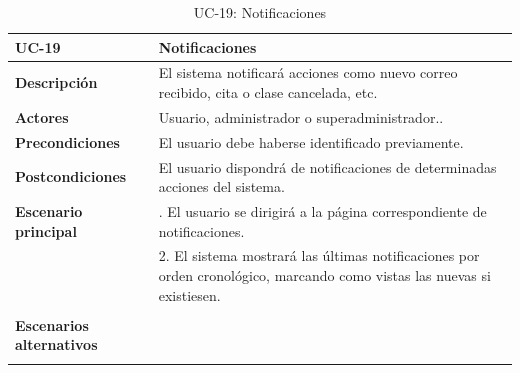 \begin{table}
  \begin{center}
    \begin{tabularx}{16.4cm}{|l|X|}
      \hline
      \textbf{UC-19} & \textbf{Notificaciones}\\
      \hline
      \textbf{Descripción} & El sistema notificará acciones como nuevo correo recibido, cita o clase cancelada, etc. \\
      \hline
      \textbf{Actores} & Usuario, administrador o superadministrador..\\
      \hline
      \textbf{Precondiciones} & El usuario debe haberse identificado previamente.\\
      \hline
      \textbf{Postcondiciones} & El usuario dispondrá de notificaciones de determinadas acciones del sistema. \\
      \hline
      \textbf{Escenario principal} & \smallskip 1. El usuario se dirigirá a la página correspondiente de notificaciones.\\
      & 2. El sistema mostrará las últimas notificaciones por orden cronológico, marcando como vistas las nuevas si existiesen.\\
      & \\
      \hline
      \textbf{Escenarios alternativos} & \\
      & \\
      \hline
    \end{tabularx}
    \caption{UC-19: Notificaciones}
    \label{tab:CU-notificaciones}
  \end{center}
\end{table}


